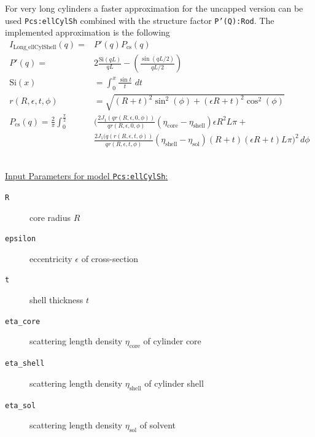 \noindent For very long cylinders a faster approximation for the
uncapped version can be used \texttt{Pcs:ellCylSh}
combined with the structure factor \texttt{P'(Q):Rod}.
The implemented approximation is the following
\begin{align}
  I_\text{Long\_ellCylShell}(q) = & P'(q) P_\text{cs}(q) \\
  P'(q)  = & 2 \frac{\text{Si}(q L)}{qL} - \left(\frac{\sin(qL/2)}{qL/2}\right) \\
  \text{Si}(x) & = \int_0^x\!\frac{\sin t}{t}\,\,dt \\
  r(R,\epsilon,t,\phi) &= \sqrt{(R+t)^2\sin^2(\phi)+(\epsilon R+t)^2\cos^2(\phi)}\\
  P_\text{cs}(q)  =  \frac{2}{\pi} \int_0^{\frac{\pi}{2}}& \biggl(
            \frac{2J_1(qr(R,\epsilon,0,\phi))}{qr(R,\epsilon,0,\phi)}
            \left(\eta_\text{core}-\eta_\text{shell}\right)\epsilon R^2L\pi + \label{eq:PcsEllCylSh}\\
         &
            \frac{2J_1(q(r(R,\epsilon,t,\phi))}{qr(R,\epsilon,t,\phi)}
            \left(\eta_\text{shell}-\eta_\text{sol}\right)(R+t)(\epsilon R+t)L\pi
      \biggr)^2  \, d\phi \nonumber
\end{align}

\hspace{1pt}\\
\underline{Input Parameters for model \texttt{Pcs:ellCylSh}:}\\
\begin{description}
\item[\texttt{R}] core radius $R$
\item[\texttt{epsilon}] eccentricity $\epsilon$ of cross-section
\item[\texttt{t}] shell thickness $t$
\item[\texttt{eta\_core}] scattering length density $\eta_\text{core}$ of cylinder core
\item[\texttt{eta\_shell}] scattering length density $\eta_\text{shell}$ of cylinder shell
\item[\texttt{eta\_sol}] scattering length density $\eta_\text{sol}$ of solvent
\end{description}

